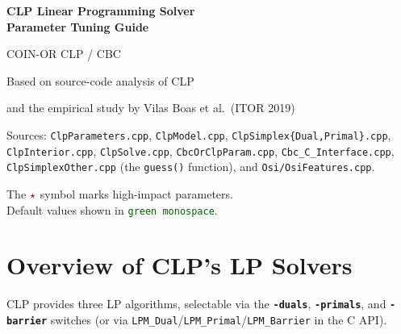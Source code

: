 \documentclass[11pt,a4paper]{article}
\newcommand{\param}[1]{\texttt{\textbf{#1}}}
\newcommand{\val}[1]{\texttt{#1}}
\newcommand{\default}[1]{\textcolor{darkgreen}{\texttt{#1}}}
\newcommand{\important}{\textcolor{darkred}{\textbf{$\star$}}}
\begin{document}
\begin{titlepage}
  \centering
  \vspace*{2cm}
  {\Huge\bfseries\color{coinblue} CLP Linear Programming Solver\\[0.4em]
   \Large Parameter Tuning Guide\par}
  \vspace{1.5em}
  {\large COIN-OR CLP / CBC\par}
  \vspace{0.5em}
  {\normalsize Based on source-code analysis of CLP\par}
  \vspace{0.3em}
  {\normalsize and the empirical study by Vilas Boas et al.\ (ITOR 2019)\par}
  \vspace{3cm}
  \begin{mdframed}[backgroundcolor=tiplightblue, linecolor=coinblue, linewidth=1pt]
    \centering\small
    Sources: \texttt{ClpParameters.cpp}, \texttt{ClpModel.cpp},
    \texttt{ClpSimplex\{Dual,Primal\}.cpp},\\
    \texttt{ClpInterior.cpp}, \texttt{ClpSolve.cpp},
    \texttt{CbcOrClpParam.cpp}, \texttt{Cbc\_C\_Interface.cpp},\\
    \texttt{ClpSimplexOther.cpp} (the \texttt{guess()} function), and
    \texttt{Osi/OsiFeatures.cpp}.
  \end{mdframed}
  \vfill
  {\small\color{gray}
    The $\important$ symbol marks high-impact parameters.\\
    Default values shown in \default{green monospace}.
  }
\end{titlepage}

\tableofcontents
\newpage

\section{Overview of CLP's LP Solvers}
\label{sec:overview}

CLP provides three LP algorithms, selectable via the \param{-duals}, \param{-primals},
and \param{-barrier} switches (or via \val{LPM\_Dual}/\val{LPM\_Primal}/\val{LPM\_Barrier}
in the C API).
\end{document}
